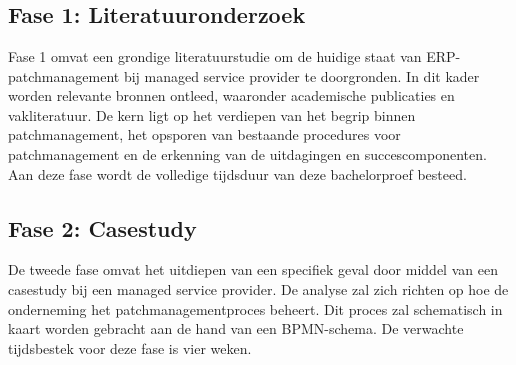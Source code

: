 
\chapter{}%
\label{ch:methodologie}



\section{Fase 1: Literatuuronderzoek}
Fase 1 omvat een grondige literatuurstudie om de huidige staat van ERP-patchmanagement bij managed service provider te doorgronden. In dit kader worden relevante bronnen ontleed, waaronder 
academische publicaties en vakliteratuur. De kern ligt op het verdiepen van het begrip binnen patchmanagement, het opsporen van bestaande procedures voor patchmanagement en de erkenning van de uitdagingen en succescomponenten. Aan deze fase wordt de volledige tijdsduur van deze bachelorproef besteed.
\section{Fase 2: Casestudy}
De tweede fase omvat het uitdiepen van een specifiek geval door middel van een casestudy bij een managed service provider. De analyse zal zich richten op hoe de onderneming het patchmanagementproces beheert. Dit
proces zal schematisch in kaart worden gebracht aan de hand van een BPMN-schema. De verwachte tijdsbestek voor deze fase is vier weken.
